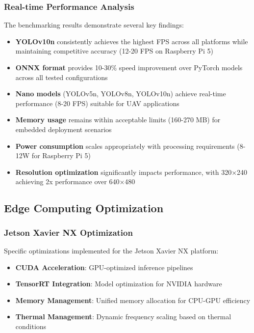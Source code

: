 \documentclass[11pt,a4paper]{article}
\begin{document}
\subsubsection{Real-time Performance Analysis}

The benchmarking results demonstrate several key findings:

\begin{itemize}
    \item \textbf{YOLOv10n} consistently achieves the highest FPS across all platforms while maintaining competitive accuracy (12-20 FPS on Raspberry Pi 5)
    \item \textbf{ONNX format} provides 10-30\% speed improvement over PyTorch models across all tested configurations
    \item \textbf{Nano models} (YOLOv5n, YOLOv8n, YOLOv10n) achieve real-time performance (8-20 FPS) suitable for UAV applications
    \item \textbf{Memory usage} remains within acceptable limits (160-270 MB) for embedded deployment scenarios
    \item \textbf{Power consumption} scales appropriately with processing requirements (8-12W for Raspberry Pi 5)
    \item \textbf{Resolution optimization} significantly impacts performance, with 320×240 achieving 2x performance over 640×480
\end{itemize}

\subsection{Edge Computing Optimization}

\subsubsection{Jetson Xavier NX Optimization}

Specific optimizations implemented for the Jetson Xavier NX platform:

\begin{itemize}
    \item \textbf{CUDA Acceleration}: GPU-optimized inference pipelines
    \item \textbf{TensorRT Integration}: Model optimization for NVIDIA hardware
    \item \textbf{Memory Management}: Unified memory allocation for CPU-GPU efficiency
    \item \textbf{Thermal Management}: Dynamic frequency scaling based on thermal conditions
\end{itemize}
\end{document}
